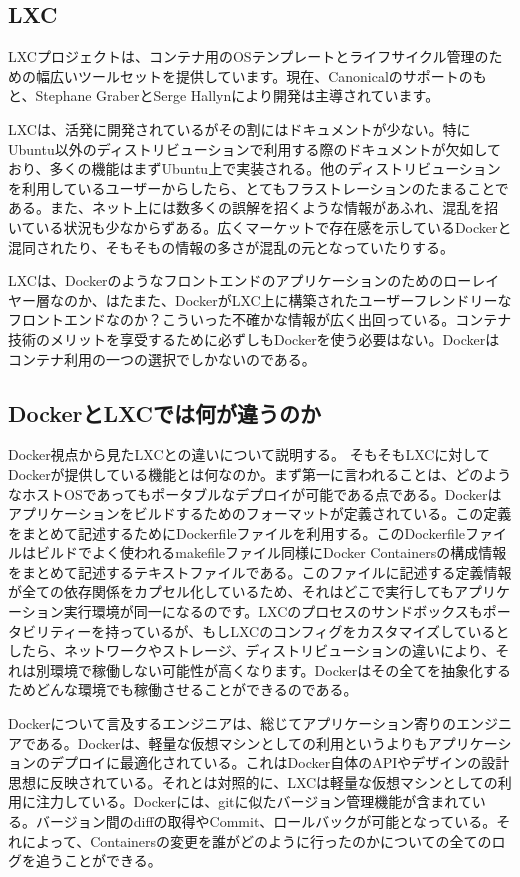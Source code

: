 ﻿\documentclass[9pt,b5paper,tombo,openany]{jsbook}
\begin{document}
\subsection{LXC}
LXCプロジェクトは、コンテナ用のOSテンプレートとライフサイクル管理のための幅広いツールセットを提供しています。現在、Canonicalのサポートのもと、Stephane GraberとSerge Hallynにより開発は主導されています。

LXCは、活発に開発されているがその割にはドキュメントが少ない。特にUbuntu以外のディストリビューションで利用する際のドキュメントが欠如しており、多くの機能はまずUbuntu上で実装される。他のディストリビューションを利用しているユーザーからしたら、とてもフラストレーションのたまることである。また、ネット上には数多くの誤解を招くような情報があふれ、混乱を招いている状況も少なからずある。広くマーケットで存在感を示しているDockerと混同されたり、そもそもの情報の多さが混乱の元となっていたりする。

LXCは、Dockerのようなフロントエンドのアプリケーションのためのローレイヤー層なのか、はたまた、DockerがLXC上に構築されたユーザーフレンドリーなフロントエンドなのか？こういった不確かな情報が広く出回っている。コンテナ技術のメリットを享受するために必ずしもDockerを使う必要はない。Dockerはコンテナ利用の一つの選択でしかないのである。

\subsection{DockerとLXCでは何が違うのか}
Docker視点から見たLXCとの違いについて説明する。
そもそもLXCに対してDockerが提供している機能とは何なのか。まず第一に言われることは、どのようなホストOSであってもポータブルなデプロイが可能である点である。Dockerはアプリケーションをビルドするためのフォーマットが定義されている。この定義をまとめて記述するためにDockerfileファイルを利用する。このDockerfileファイルはビルドでよく使われるmakefileファイル同様にDocker Containersの構成情報をまとめて記述するテキストファイルである。このファイルに記述する定義情報が全ての依存関係をカプセル化しているため、それはどこで実行してもアプリケーション実行環境が同一になるのです。LXCのプロセスのサンドボックスもポータビリティーを持っているが、もしLXCのコンフィグをカスタマイズしているとしたら、ネットワークやストレージ、ディストリビューションの違いにより、それは別環境で稼働しない可能性が高くなります。Dockerはその全てを抽象化するためどんな環境でも稼働させることができるのである。

Dockerについて言及するエンジニアは、総じてアプリケーション寄りのエンジニアである。Dockerは、軽量な仮想マシンとしての利用というよりもアプリケーションのデプロイに最適化されている。これはDocker自体のAPIやデザインの設計思想に反映されている。それとは対照的に、LXCは軽量な仮想マシンとしての利用に注力している。Dockerには、gitに似たバージョン管理機能が含まれている。バージョン間のdiffの取得やCommit、ロールバックが可能となっている。それによって、Containersの変更を誰がどのように行ったのかについての全てのログを追うことができる。
\end{document}
